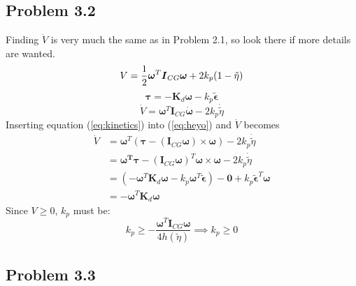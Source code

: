 \subsection*{Problem 3.2}
Finding $\dot{V}$ is very much the same as in Problem 2.1, so look there if more details are wanted. 
\begin{equation}
 V = \frac{1}{2} \boldsymbol{\omega}^T\boldsymbol{I}_{CG}\boldsymbol{\omega} + 2k_p(1-\tilde{\eta})\\
\end{equation}
\begin{equation}
 \boldsymbol{\tau}= -\boldsymbol{K}_d\boldsymbol{\omega}-k_p\tilde{\boldsymbol{\epsilon}}
\end{equation}
\begin{equation} \label{eq:heyo}
       \dot{V} = \boldsymbol{\omega}^T\boldsymbol{I}_{CG}\boldsymbol{\dot{\omega}}-2k_p\dot{\tilde{\eta}}
\end{equation}
Inserting equation (\ref{eq:kinetics}) into (\ref{eq:heyo}) and $\dot{V}$ becomes
\begin{align}
    \dot{V} &= \boldsymbol{\omega}^T(\boldsymbol{\tau}-(\boldsymbol{I}_{CG}\boldsymbol{\omega})\times \boldsymbol{\omega}) - 2k_p\dot{\tilde{\eta}}\\
    &=\boldsymbol{\omega^T}\boldsymbol{\tau}-(\boldsymbol{I}_{CG}\boldsymbol{\omega})^T\boldsymbol{\omega}\times\boldsymbol{\omega} - 2k_p\dot{\tilde{\eta}}\\ 
    &=(-\boldsymbol{\omega}^T\boldsymbol{K}_d\boldsymbol{\omega}-k_p\boldsymbol{\omega}^T\tilde{\boldsymbol{\epsilon}})-\boldsymbol{0}+k_p\tilde{\boldsymbol{\epsilon}}^T\boldsymbol{\omega}\\
    &= -\boldsymbol{\omega}^T\boldsymbol{K}_d\boldsymbol{\omega}
\end{align}
Since $V\ge 0$, $k_p$ must be:
\begin{equation}
       k_p \ge - \frac{ \boldsymbol{\omega}^T\boldsymbol{I}_{CG}\boldsymbol{\omega}}{4h(\tilde{\eta})}
       \implies k_p \ge 0
\end{equation}

\subsection*{Problem 3.3}

